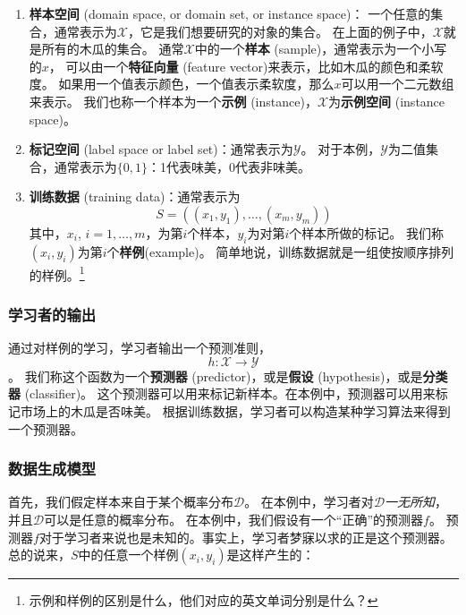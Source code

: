 \begin{enumerate}

\item
  \textbf{样本空间} (domain space, or domain set, or instance space)：
  一个任意的集合，通常表示为\(\mathcal{X}\)，它是我们想要研究的对象的集合。
  在上面的例子中，\(\mathcal{X}\)就是所有的木瓜的集合。
  通常\(\mathcal{X}\)中的一个\textbf{样本}
  (sample)，通常表示为一个小写的\(x\)， 可以由一个\textbf{特征向量}
  (feature vector)来表示，比如木瓜的颜色和柔软度。
  如果用一个值表示颜色，一个值表示柔软度，那么\(x\)可以用一个二元数组来表示。
  我们也称一个样本为一个\textbf{示例}
  (instance)，\(\mathcal{X}\)为\textbf{示例空间} (instance space)。
\item
  \textbf{标记空间} (label space or label
  set)：通常表示为\(\mathcal{Y}\)。
  对于本例，\(\mathcal{Y}\)为二值集合，通常表示为\(\{0,1\}\)：1代表味美，0代表非味美。
\item
  \textbf{训练数据} (training data)：通常表示为
  \[S = \left(\left(x_1,y_1\right),\ldots,\left(x_m,y_m\right)\right)\]
  其中，\(x_i\),
  \(i=1,\ldots,m\)，为第\(i\)个样本，\(y_i\)为对第\(i\)个样本所做的标记。
  我们称\(\left(x_i,y_i\right)\)为第\(i\)个\textbf{样例}(example)。
  简单地说，训练数据就是一组使按顺序排列的样例。\footnote{示例和样例的区别是什么，他们对应的英文单词分别是什么？}
\end{enumerate}

\subsubsection{学习者的输出}

通过对样例的学习，学习者输出一个预测准则，\[h: \mathcal{X} \rightarrow \mathcal{Y}\]。
我们称这个函数为一个\textbf{预测器} (predictor)，或是\textbf{假设}
(hypothesis)，或是\textbf{分类器} (classifier)。
这个预测器可以用来标记新样本。在本例中，预测器可以用来标记市场上的木瓜是否味美。
根据训练数据，学习者可以构造某种学习算法来得到一个预测器。

\subsubsection{数据生成模型}

首先，我们假定样本来自于某个概率分布\(\mathcal{D}\)。
在本例中，学习者对\(\mathcal{D}\)\emph{一无所知}，并且\(\mathcal{D}\)可以是任意的概率分布。
在本例中，我们假设有一个``正确''的预测器\(f\)。
预测器\(f\)对于学习者来说也是未知的。事实上，学习者梦寐以求的正是这个预测器。
总的说来，\(S\)中的任意一个样例\(\left(x_i,y_i\right)\)是这样产生的：


